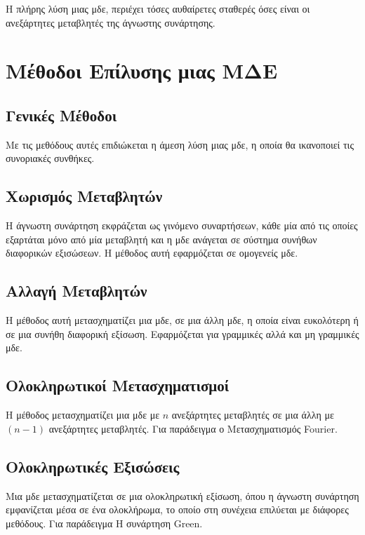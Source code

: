 \begin{rem}
  Η πλήρης λύση μιας μδε, περιέχει τόσες αυθαίρετες 
  σταθερές όσες είναι οι ανεξάρτητες μεταβλητές της άγνωστης συνάρτησης.
\end{rem}


\section*{Μέθοδοι Επίλυσης μιας ΜΔΕ}

\subsection*{Γενικές Μέθοδοι}

Με τις μεθόδους αυτές επιδιώκεται η άμεση λύση μιας μδε, 
η οποία θα ικανοποιεί τις συνοριακές συνθήκες.

\subsection*{Χωρισμός Μεταβλητών}

Η άγνωστη συνάρτηση εκφράζεται ως γινόμενο συναρτήσεων, 
κάθε μία από τις οποίες εξαρτάται μόνο από μία μεταβλητή και η μδε ανάγεται σε 
σύστημα συνήθων διαφορικών εξισώσεων. Η μέθοδος αυτή εφαρμόζεται σε ομογενείς μδε.


\subsection*{Αλλαγή Μεταβλητών} 

Η μέθοδος αυτή μετασχηματίζει μια μδε, σε μια άλλη μδε, η 
οποία είναι ευκολότερη ή σε μια συνήθη διαφορική εξίσωση. Εφαρμόζεται για γραμμικές
αλλά και μη γραμμικές μδε.

\subsection*{Ολοκληρωτικοί Μετασχηματισμοί} 

Η μέθοδος μετασχηματίζει μια μδε με $n$
ανεξάρτητες μεταβλητές σε μια άλλη με $ (n-1) $ ανεξάρτητες μεταβλητές. Για 
παράδειγμα ο Μετασχηματισμός Fourier.

\subsection*{Ολοκληρωτικές Εξισώσεις} 

Μια μδε μετασχηματίζεται σε μια ολοκληρωτική εξίσωση, 
όπου η άγνωστη συνάρτηση εμφανίζεται μέσα σε ένα ολοκλήρωμα, το οποίο στη συνέχεια 
επιλύεται με διάφορες μεθόδους. Για παράδειγμα Η συνάρτηση Green.

